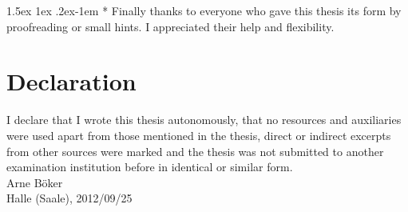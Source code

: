\documentclass[a4paper,12pt,twoside]{article}
\makeatletter
\renewcommand{\paragraph}{%
  \@startsection{paragraph}{4}%
  {\z@}{1.5ex \@plus 1ex \@minus .2ex}{-1em}%
  {\normalfont\normalsize\bfseries}%
}
\newcommand{\blankpage}{ %
\newpage
\thispagestyle{empty}
\mbox{}
\newpage
}
\makeatother
\begin{document}
\paragraph*{} Finally thanks to everyone who gave this thesis its form by proofreading or small hints. I appreciated their help and flexibility.
\newpage
\blankpage
\section*{Declaration}
I declare that I wrote this thesis autonomously, that no resources and auxiliaries were used apart from those mentioned in the thesis, direct or indirect excerpts from other sources were marked and the thesis was not submitted to another examination institution before in identical or similar form.\\[60pt]
Arne Böker\\
Halle (Saale), 2012/09/25
\end{document}
